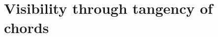 \documentclass[runningheads]{llncs}
\begin{document}
%
%
%
%



    \section{Visibility through tangency of chords}
\end{document}
